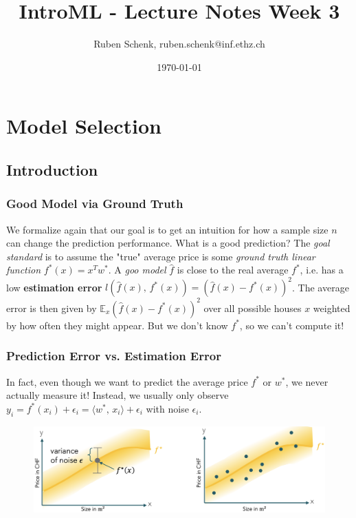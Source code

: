 \documentclass[a4paper]{extarticle}
\title{IntroML - Lecture Notes Week 3}
\author{Ruben Schenk, ruben.schenk@inf.ethz.ch}
\date{\today}
\begin{document}
\maketitle

\section{Model Selection}

\subsection{Introduction}

\subsubsection{Good Model via Ground Truth}

We formalize again that our goal is to get an intuition for how a sample size \(n\) can change the prediction performance. What is a good prediction? The \textit{goal standard} is to assume the "true" average price is some \textit{ground truth linear function} \(f^*(x) = x^Tw^*\). A \textit{goo model} \(\hat{f}\) is close to the real average \(f^*\), i.e. has a low \textbf{estimation error} \(l(\hat{f}(x), \, f^*(x)) = (\hat{f}(x) - f^*(x))^2\). The average error is then given by \(\mathbb{E}_x(\hat{f}(x)-f^*(x))^2\) over all possible houses \(x\) weighted by how often they might appear. But we don't know \(f^*\), so we can't compute it!

\subsubsection{Prediction Error vs. Estimation Error}

In fact, even though we want to predict the average price \(f^*\) or \(w^*\), we never actually measure it! Instead, we usually only observe \(y_i = f^*(x_i) + \epsilon_i = \langle w^*, \, x_i \rangle + \epsilon_i\) with noise \(\epsilon_i\).

\begin{figure}[H]
    \includegraphics[width=15cm]{../images/IntroML_Fig3-1}
    \centering
\end{figure}
\end{document}
